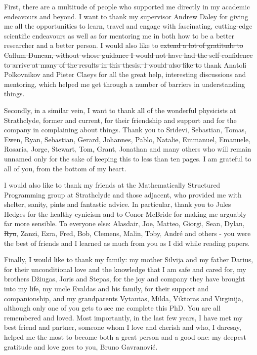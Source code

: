 \documentclass[a4paper,oneside,11pt]{book}
\providecommand{\DIFaddtex}[1]{{\protect\color{blue}\uwave{#1}}} %
\providecommand{\DIFdeltex}[1]{{\protect\color{red}\sout{#1}}}                      %
\providecommand{\DIFaddbegin}{} %
\providecommand{\DIFaddend}{} %
\providecommand{\DIFdelbegin}{} %
\providecommand{\DIFdelend}{} %
\providecommand{\DIFadd}[1]{\texorpdfstring{\DIFaddtex{#1}}{#1}} %
\providecommand{\DIFdel}[1]{\texorpdfstring{\DIFdeltex{#1}}{}} %
\newcommand{\DIFscaledelfig}{0.5}
\newlength{\DIFdelgraphicswidth} %
\newlength{\DIFdelgraphicsheight} %
\newcommand{\DIFaddincludegraphics}[2][]{{\color{blue}\fbox{\DIFOincludegraphics[#1]{#2}}}} %
\newcommand{\DIFdelincludegraphics}[2][]{%
\sbox{\DIFdelgraphicsbox}{\DIFOincludegraphics[#1]{#2}}%
\settoboxwidth{\DIFdelgraphicswidth}{\DIFdelgraphicsbox} %
\settoboxtotalheight{\DIFdelgraphicsheight}{\DIFdelgraphicsbox} %
\scalebox{\DIFscaledelfig}{%
\parbox[b]{\DIFdelgraphicswidth}{\usebox{\DIFdelgraphicsbox}\\[-\baselineskip] \rule{\DIFdelgraphicswidth}{0em}}\llap{\resizebox{\DIFdelgraphicswidth}{\DIFdelgraphicsheight}{%
\setlength{\unitlength}{\DIFdelgraphicswidth}%
\begin{picture}(1,1)%
\thicklines\linethickness{2pt} %
{\color[rgb]{1,0,0}\put(0,0){\framebox(1,1){}}}%
{\color[rgb]{1,0,0}\put(0,0){\line( 1,1){1}}}%
{\color[rgb]{1,0,0}\put(0,1){\line(1,-1){1}}}%
\end{picture}%
}\hspace*{3pt}}} %
} %
\DeclareRobustCommand{\DIFaddbegin}{\DIFOaddbegin \let\includegraphics\DIFaddincludegraphics} %
\DeclareRobustCommand{\DIFaddend}{\DIFOaddend \let\includegraphics\DIFOincludegraphics} %
\DeclareRobustCommand{\DIFdelbegin}{\DIFOdelbegin \let\includegraphics\DIFdelincludegraphics} %
\DeclareRobustCommand{\DIFdelend}{\DIFOaddend \let\includegraphics\DIFOincludegraphics} %
\begin{document}
First, there are a multitude of people who supported me directly in my academic endeavours and beyond. I want to thank my supervisor Andrew Daley for giving me all the opportunities to learn, travel and engage with fascinating, cutting-edge scientific endeavours as well as for mentoring me in both how to be a better researcher and a better person. I would also like to \DIFdelbegin \DIFdel{extend a lot of gratitude to Callum Duncan, without whose guidance I would not have had the self-confidence to arrive at many of the results in this thesis. I would also like to }\DIFdelend thank Anatoli Polkovnikov and Pieter Claeys for all the great help, interesting discussions and mentoring, which helped me get through a number of barriers in understanding things.

Secondly, in a similar vein, I want to thank all of the wonderful physicists at Strathclyde, former and current, for their friendship and support and for the company in complaining about things. Thank you to Sridevi, Sebastian, Tomas, Ewen, Ryan, Sebastian, Gerard, Johannes, Pablo, Natalie, Emmanuel, Emanuele, Rosaria, Jorge, Stewart, Tom, Grant, Jonathan and many others who will remain unnamed only for the sake of keeping this to less than ten pages. I am grateful to all of you, from the bottom of my heart. 

I would also like to thank my friends at the Mathematically Structured Programming group at Strathclyde and those adjacent, who provided me with shelter, sanity, pints and fantastic advice. In particular, thank you to Jules Hedges for the healthy cynicism and to Conor McBride for making me arguably far more sensible. To everyone else: Alasdair, Joe, Matteo, Giorgi, Sean, Dylan, \DIFdelbegin \DIFdel{Ryu}\DIFdelend \DIFaddbegin \DIFadd{Riu}\DIFaddend , Zanzi, Ezra, Fred, Bob, Clemens, Malin, Toby, André and others - you were the best of friends and I learned as much from you as I did while reading papers.

Finally, I would like to thank my family: my mother Silvija and my father Darius, for their unconditional love and the knowledge that I am safe and cared for, my brothers Džiugas, Joris and Stepas, for the joy and company they have brought into my life, my uncle Evaldas and his family, for their support and companionship, and my grandparents Vytautas, Milda, Viktoras and Virginija, although only one of you gets to see me complete this PhD. You are all remembered and loved. Most importantly, in the last few years, I have met my best friend and partner, someone whom I love and cherish and who, I daresay, helped me the most to become both a great person and a good one: my deepest gratitude and love goes to you, Bruno Gavranović.
\end{document}
